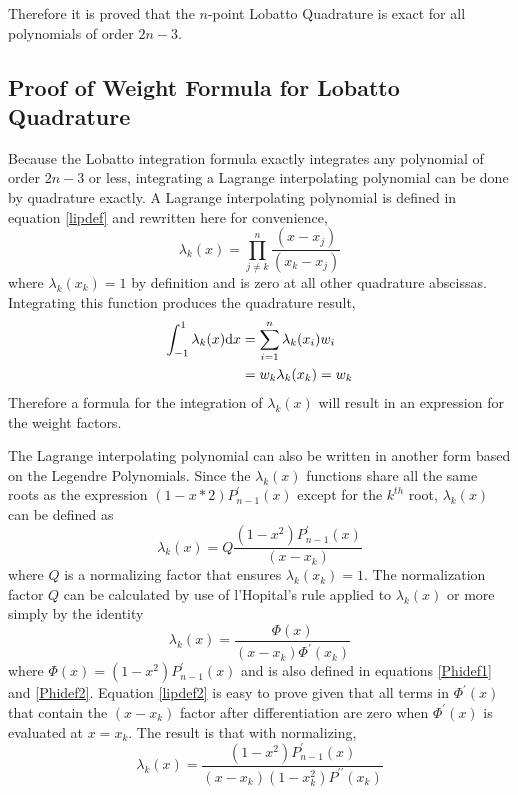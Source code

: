 \documentclass[preprint]{revtex4}
\newcommand{\dx}{{\rm d}x}
\newcommand{\intunit}{\ensuremath{\int_{-1}^{1}}}
\newcommand{\sumunit}{\ensuremath{\sum_{i=1}^{n}}}
\begin{document}
Therefore it is proved that the $n$-point Lobatto Quadrature is exact for all 
polynomials of order $2n-3$. 

\subsection{Proof of Weight Formula for Lobatto Quadrature}
Because the Lobatto integration formula exactly integrates any polynomial of order
$2n-3$ or less, integrating a Lagrange interpolating polynomial can be done by 
quadrature exactly. A Lagrange interpolating polynomial is defined in equation 
\ref{lipdef} and rewritten here for convenience, 
\begin{equation}
\lambda_k(x)=\prod_{j \ne k}^n\frac{(x-x_j)}{(x_k-x_j)} \nonumber
\end{equation}
where $\lambda_k(x_k)=1$ by definition and is zero at all other quadrature abscissas. 
Integrating this function produces the quadrature result, 
\begin{align}
\label{lipint1}
\intunit \lambda_k(x)\dx &= \sumunit \lambda_k(x_i)w_i \nonumber \\
&= w_k\lambda_k(x_k) = w_k
\end{align}
Therefore a formula for the integration of $\lambda_k(x)$ will result in 
an expression for the weight factors. 

The Lagrange interpolating polynomial can also be written in another form
based on the Legendre Polynomials. Since the $\lambda_k(x)$ functions share
all the same roots as the expression $(1-x*2)P^\prime_{n-1}(x)$ except for
the $k^{th}$ root, $\lambda_k(x)$ can be defined as
\begin{equation}
\lambda_k(x)=Q\frac{(1-x^2)P^\prime_{n-1}(x)}{(x-x_k)}
\end{equation}
where $Q$ is a normalizing factor that ensures $\lambda_k(x_k)=1$. 
The normalization factor $Q$ can be calculated by use of l'Hopital's rule
applied to $\lambda_k(x)$ or more simply by the identity \cite{Dahlquist_gaussquad}
\begin{equation}
\label{lipdef2}
\lambda_k(x)=\frac{\Phi(x)}{(x-x_k)\Phi^\prime(x_k)}
\end{equation}
where $\Phi(x)=(1-x^2)P_{n-1}^\prime(x)$ and is also defined in equations \ref{Phidef1}
and \ref{Phidef2}. Equation \ref{lipdef2} is easy to prove given that all terms in 
$\Phi^\prime(x)$ that contain the $(x-x_k)$ factor after differentiation are zero when
$\Phi^\prime(x)$ is evaluated at $x=x_k$. 
The result is that with normalizing, 
\begin{equation}
\label{lipdef3}
\lambda_k(x)=\frac{(1-x^2)P^\prime_{n-1}(x)}{(x-x_k)(1-x_k^2)P^{\prime\prime}(x_k)}
\end{equation}
\end{document}

